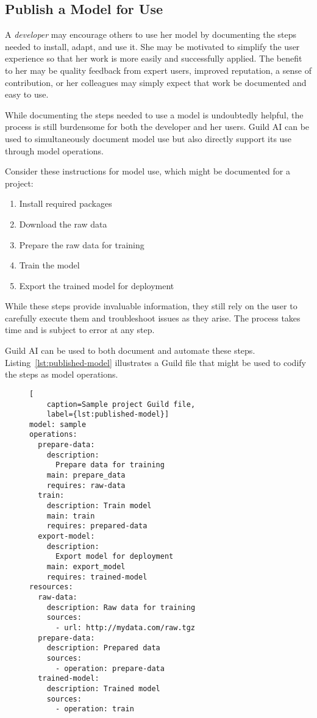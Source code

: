 \documentclass{article}
\begin{document}
\subsection{Publish a Model for Use}
\label{sec:publish-model}

A \emph{developer} may encourage others to use her model by
documenting the steps needed to install, adapt, and use it. She may be
motivated to simplify the user experience so that her work is more
easily and successfully applied. The benefit to her may be quality
feedback from expert users, improved reputation, a sense of
contribution, or her colleagues may simply expect that work be
documented and easy to use.

While documenting the steps needed to use a model is undoubtedly
helpful, the process is still burdensome for both the developer and
her users. Guild AI can be used to simultaneously document model use
but also directly support its use through model operations.

Consider these instructions for model use, which might be documented
for a project:

\setlength{\parindent}{1em}
\begin{enumerate}
\item Install required packages
\item Download the raw data
\item Prepare the raw data for training
\item Train the model
\item Export the trained model for deployment
\end{enumerate}
\setlength{\parindent}{0em}

While these steps provide invaluable information, they still rely on
the user to carefully execute them and troubleshoot issues as they
arise. The process takes time and is subject to error at any step.

Guild AI can be used to both document and automate these
steps. Listing~\ref{lst:published-model} illustrates a Guild file that
might be used to codify the steps as model operations.

\begin{figure}
\begin{lstlisting}[
    caption=Sample project Guild file,
    label={lst:published-model}]
model: sample
operations:
  prepare-data:
    description:
      Prepare data for training
    main: prepare_data
    requires: raw-data
  train:
    description: Train model
    main: train
    requires: prepared-data
  export-model:
    description:
      Export model for deployment
    main: export_model
    requires: trained-model
resources:
  raw-data:
    description: Raw data for training
    sources:
      - url: http://mydata.com/raw.tgz
  prepare-data:
    description: Prepared data
    sources:
      - operation: prepare-data
  trained-model:
    description: Trained model
    sources:
      - operation: train
\end{lstlisting}
\end{figure}
\end{document}
